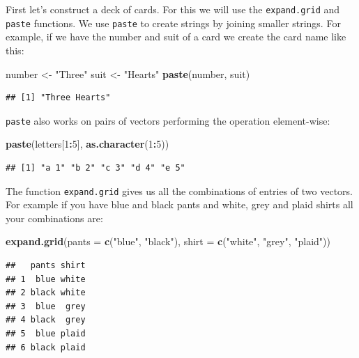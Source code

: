 \documentclass[
  openany]{book}
\newenvironment{Shaded}{\begin{snugshade}}{\end{snugshade}}
\newcommand{\DataTypeTok}[1]{\textcolor[rgb]{0.13,0.29,0.53}{#1}}
\newcommand{\DecValTok}[1]{\textcolor[rgb]{0.00,0.00,0.81}{#1}}
\newcommand{\KeywordTok}[1]{\textcolor[rgb]{0.13,0.29,0.53}{\textbf{#1}}}
\newcommand{\NormalTok}[1]{#1}
\newcommand{\OperatorTok}[1]{\textcolor[rgb]{0.81,0.36,0.00}{\textbf{#1}}}
\newcommand{\StringTok}[1]{\textcolor[rgb]{0.31,0.60,0.02}{#1}}
\begin{document}
First let's construct a deck of cards. For this we will use the \texttt{expand.grid} and \texttt{paste} functions. We use \texttt{paste} to create strings by joining smaller strings. For example, if we have the number and suit of a card we create the card name like this:

\begin{Shaded}
\begin{Highlighting}[]
\NormalTok{number <-}\StringTok{ "Three"}
\NormalTok{suit <-}\StringTok{ "Hearts"}
\KeywordTok{paste}\NormalTok{(number, suit)}
\end{Highlighting}
\end{Shaded}

\begin{verbatim}
## [1] "Three Hearts"
\end{verbatim}

\texttt{paste} also works on pairs of vectors performing the operation element-wise:

\begin{Shaded}
\begin{Highlighting}[]
\KeywordTok{paste}\NormalTok{(letters[}\DecValTok{1}\OperatorTok{:}\DecValTok{5}\NormalTok{], }\KeywordTok{as.character}\NormalTok{(}\DecValTok{1}\OperatorTok{:}\DecValTok{5}\NormalTok{))}
\end{Highlighting}
\end{Shaded}

\begin{verbatim}
## [1] "a 1" "b 2" "c 3" "d 4" "e 5"
\end{verbatim}

The function \texttt{expand.grid} gives us all the combinations of entries of two vectors. For example if you have blue and black pants and white, grey and plaid shirts all your combinations are:

\begin{Shaded}
\begin{Highlighting}[]
\KeywordTok{expand.grid}\NormalTok{(}\DataTypeTok{pants =} \KeywordTok{c}\NormalTok{(}\StringTok{"blue"}\NormalTok{, }\StringTok{"black"}\NormalTok{), }\DataTypeTok{shirt =} \KeywordTok{c}\NormalTok{(}\StringTok{"white"}\NormalTok{, }\StringTok{"grey"}\NormalTok{, }\StringTok{"plaid"}\NormalTok{))}
\end{Highlighting}
\end{Shaded}

\begin{verbatim}
##   pants shirt
## 1  blue white
## 2 black white
## 3  blue  grey
## 4 black  grey
## 5  blue plaid
## 6 black plaid
\end{verbatim}
\end{document}
